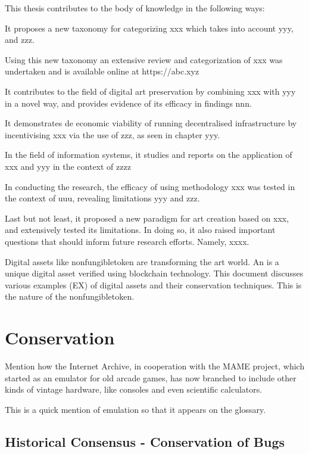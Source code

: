 This thesis contributes to the body of knowledge in the following ways:

It proposes a new taxonomy for categorizing xxx which takes into account yyy, and zzz.

Using this new taxonomy an extensive review and categorization of xxx was undertaken and is available online at https://abc.xyz

It contributes to the field of digital art preservation by combining xxx with yyy in a novel way, and provides evidence of its efficacy in findings nnn.

It demonstrates de economic viability of running decentralised infrastructure by incentivising xxx via the use of zzz, as seen in chapter yyy.

In the field of information systems, it studies and reports on the application of xxx and yyy in the context of zzzz

In conducting the research, the efficacy of using methodology xxx was tested in the context of uuu, revealing limitations yyy and zzz.

Last but not least, it proposed a new paradigm for art creation based on xxx, and extensively tested its limitations. In doing so, it also raised important questions that should inform future research efforts. Namely, xxxx.

Digital assets like \gls{nonfungibletoken} are transforming the art world. An  is a unique digital asset verified using blockchain technology.
This document discusses various examples (EX) of digital assets and their conservation techniques. This is the nature of the \gls{nonfungibletoken}.


\section{Conservation}

Mention how the Internet Archive, in cooperation with the MAME project, which started as an emulator for old arcade games, has now branched to include other kinds of vintage hardware, like consoles and even scientific calculators. \cite{scottjasonCalculatedMoveCalculators2023}

This is a quick mention of \gls{emulation} so that it appears on the glossary.


\subsection{Historical Consensus - Conservation of Bugs}

